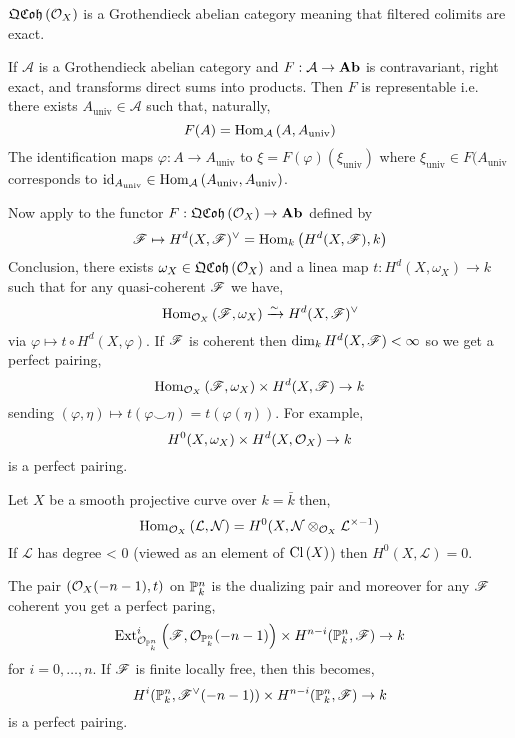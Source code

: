 \documentclass[12pt]{article}
\begin{document}
\begin{theorem}
$\QCoh{\struct{X}}$ is a Grothendieck abelian category meaning that filtered colimits are exact.
\end{theorem}

\begin{theorem}
If $\mathcal{A}$ is a Grothendieck abelian category and $F : \mathcal{A} \to \Ab$ is contravariant, right exact, and transforms direct sums into products. Then $F$ is representable i.e. there exists $A_{\text{univ}} \in \mathcal{A}$ such that, naturally,
\[ F(A) = \Homover{\mathcal{A}}{A}{A_{\text{univ}}} \]
The identification maps $\varphi : A \to A_{\text{univ}}$ to $\xi = F(\varphi)(\xi_{\text{univ}})$ where $\xi_{\text{univ}} \in F(A_{\text{univ}}$ corresponds to $\id_{A_{\text{univ}}} \in \Homover{\mathcal{A}}{A_{\text{univ}}}{A_{\text{univ}}}$.
\end{theorem}
Now apply to the functor $F : \QCoh{\struct{X}} \to \Ab$ defined by 
\[ \F \mapsto H^d(X, \F)^\vee = \Homover{k}{H^d(X,\F)}{k} \]
Conclusion, there exists $\omega_X \in \QCoh{\struct{X}}$ and a linea map $t : H^d(X, \omega_X) \to k$ such that for any quasi-coherent $\F$ we have,
\[ \Homover{\struct{X}}{\F}{\omega_X} \xrightarrow{\sim} H^d(X, \F)^\vee \]
via $\varphi \mapsto t \circ H^d(X, \varphi)$. If $\F$ is coherent then $\dim_k H^d(X, \F) < \infty$ so we get a perfect pairing,
\[ \Homover{\struct{X}}{\F}{\omega_X} \times H^d(X, \F) \to k \]
sending $(\varphi, \eta) \mapsto t(\varphi \smile \eta) = t(\varphi(\eta))$.
For example,
\[ H^0(X, \omega_X) \times H^d(X, \struct{X}) \to k \]
is a perfect pairing. 

\begin{theorem}
Let $X$ be a smooth projective curve over $k = \bar{k}$ then,
\[ \Homover{\struct{X}}{\mathcal{L}}{\mathcal{N}} = H^0(X, \mathcal{N} \otimes_{\struct{X}} \mathcal{L}^{\times - 1}) \]
If $\mathcal{L}$ has degree < 0 (viewed as an element of $\Cl{X}$) then $H^0(X, \mathcal{L}) = 0$.
\end{theorem}

\begin{theorem}
The pair $(\struct{X}(-n-1), t)$ on $\P^n_k$ is the dualizing pair and moreover for any $\F$ coherent you get a perfect paring,
\[ \Ext{i}{\struct{\P^n_k}}{\F}{\struct{\P^n_k}(-n-1)} \times H^{n-i}(\P^n_k, \F) \to k \]
for $i = 0, \dots, n$. If $\F$ is finite locally free, then this becomes,
\[ H^i(\P_k^n, \F^\vee(-n-1)) \times H^{n-i}(\P^n_k, \F) \to k \]
is a perfect pairing.
\end{theorem}
\end{document}

